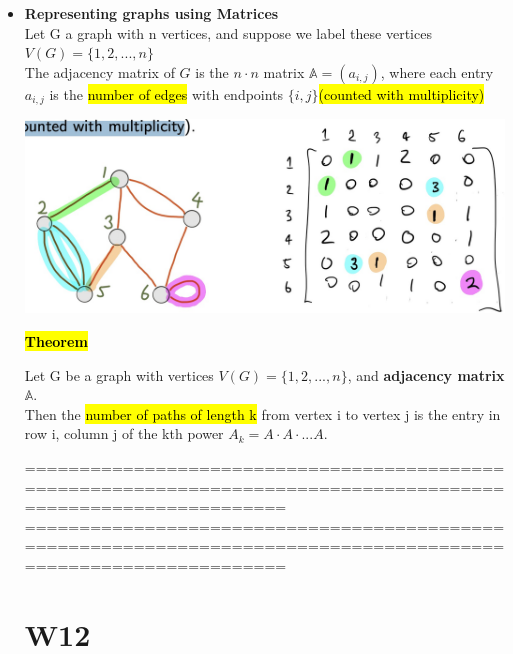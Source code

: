 \documentclass{article}
\begin{document}
\begin{itemize}
\item \textbf{Representing graphs using Matrices}\\
Let G a graph with n vertices, and suppose we label these vertices
$V(G) = \{1, 2,..., n\}$\\
The adjacency matrix of $G$ is the $n \cdot n$ matrix $\mathbb{A} =(a_{i,j})$, where each entry $a_{i,j}$ is the \hl{number of edges} with endpoints $\{i,j\}$\hl{(counted with multiplicity)}\\
\begin{center}
\includegraphics[width=0.8\linewidth]{graph/27.jpg} \\%
\end{center}
\hl{\textbf{Theorem}}


Let G be a graph with vertices $V(G) = \{1, 2,..., n\}$, and
\textbf{adjacency matrix} $\mathbb{A}$.\\
Then the \hl{number of paths of length k} from vertex i to vertex j is the
entry in row i, column j of the kth power $A_k = A \cdot A \cdot ...  A$.

================================================================================================================
\newpage
================================================================================================================\\

\section{W12}


\end{itemize}
\end{document}
